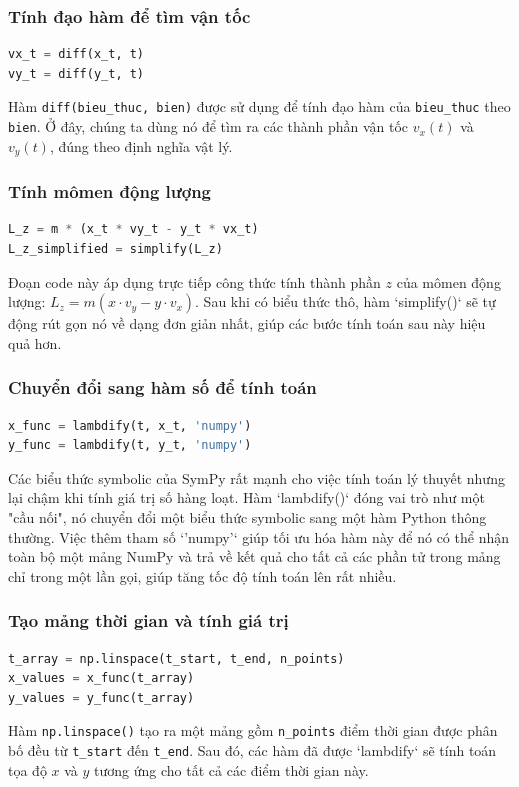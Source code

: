 \documentclass{report}
\begin{document}
\subsubsection{Tính đạo hàm để tìm vận tốc}
\begin{lstlisting}[language=Python, caption=Tính vận tốc]
vx_t = diff(x_t, t)
vy_t = diff(y_t, t)
\end{lstlisting}
\justifying Hàm \texttt{diff(bieu\_thuc, bien)} được sử dụng để tính đạo hàm của \texttt{bieu\_thuc} theo \texttt{bien}. Ở đây, chúng ta dùng nó để tìm ra các thành phần vận tốc $v_x(t)$ và $v_y(t)$, đúng theo định nghĩa vật lý.

\subsubsection{Tính mômen động lượng}
\begin{lstlisting}[language=Python, caption=Tính mômen động lượng]
L_z = m * (x_t * vy_t - y_t * vx_t)
L_z_simplified = simplify(L_z)
\end{lstlisting}
Đoạn code này áp dụng trực tiếp công thức tính thành phần $z$ của mômen động lượng: $L_z = m(x \cdot v_y - y \cdot v_x)$. Sau khi có biểu thức thô, hàm `simplify()` sẽ tự động rút gọn nó về dạng đơn giản nhất, giúp các bước tính toán sau này hiệu quả hơn.

\subsubsection{Chuyển đổi sang hàm số để tính toán}
\begin{lstlisting}[language=Python]
x_func = lambdify(t, x_t, 'numpy')
y_func = lambdify(t, y_t, 'numpy')
\end{lstlisting}
Các biểu thức symbolic của SymPy rất mạnh cho việc tính toán lý thuyết nhưng lại chậm khi tính giá trị số hàng loạt. Hàm `lambdify()` đóng vai trò như một "cầu nối", nó chuyển đổi một biểu thức symbolic sang một hàm Python thông thường. Việc thêm tham số `'numpy'` giúp tối ưu hóa hàm này để nó có thể nhận toàn bộ một mảng NumPy và trả về kết quả cho tất cả các phần tử trong mảng chỉ trong một lần gọi, giúp tăng tốc độ tính toán lên rất nhiều.

\subsubsection{Tạo mảng thời gian và tính giá trị}
\begin{lstlisting}[language=Python]
t_array = np.linspace(t_start, t_end, n_points)
x_values = x_func(t_array)
y_values = y_func(t_array)
\end{lstlisting}
\justifying Hàm \texttt{np.linspace()} tạo ra một mảng gồm \texttt{n\_points} điểm thời gian được phân bố đều từ \texttt{t\_start} đến \texttt{t\_end}. Sau đó, các hàm đã được `lambdify` sẽ tính toán tọa độ $x$ và $y$ tương ứng cho tất cả các điểm thời gian này.
\end{document}
